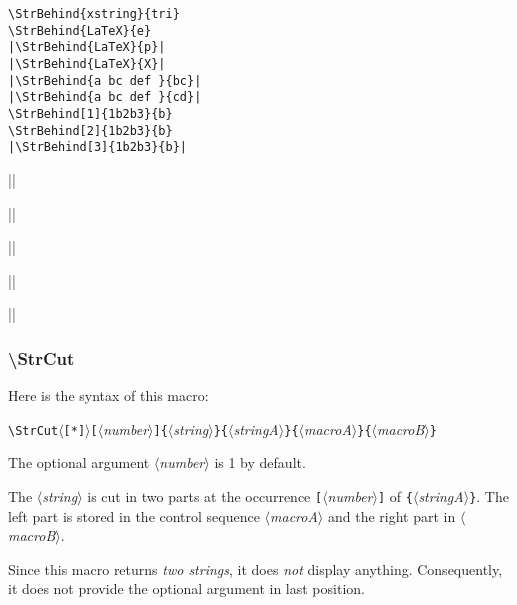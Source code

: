 \documentclass[a4paper,10pt]{article}
\newcommand\argu[1]{$\langle$\textit{#1}$\rangle$}
\newcommand\ARGU[1]{\texttt{\{}\argu{#1}\texttt{\}}}
\newcommand\arguC[1]{\texttt{[}\argu{#1}\texttt{]}}
\newcommand\etoile{$\langle$\texttt{[*]}$\rangle$}
\newcommand\styleexemple{\small\vskip4pt}
\newcommand\verbinline{\lstinline[basicstyle=\normalsize\ttfamily]}
\begin{document}
\begin{minipage}[t]{0.65\linewidth}
\begin{lstlisting}
\StrBehind{xstring}{tri}
\StrBehind{LaTeX}{e}
|\StrBehind{LaTeX}{p}|
|\StrBehind{LaTeX}{X}|
|\StrBehind{a bc def }{bc}|
|\StrBehind{a bc def }{cd}|
\StrBehind[1]{1b2b3}{b}
\StrBehind[2]{1b2b3}{b}
|\StrBehind[3]{1b2b3}{b}|
\end{lstlisting}%
\end{minipage}\hfill
\begin{minipage}[t]{0.35\linewidth}
	\styleexemple
	\par
	\par
	||\par
	||\par
	||\par
	||\par
	\par
	\par
	||
\end{minipage}%

\subsubsection{\ttfamily\textbackslash StrCut}
Here is the syntax of this macro:\par\nobreak\smallskip
\verbinline|\StrCut|\etoile\arguC{number}\ARGU{string}\ARGU{stringA}\ARGU{macroA}\ARGU{macroB}
\smallskip

The optional argument \argu{number} is 1 by default.\par\nobreak\smallskip
The \argu{string} is cut in two parts at the occurrence \arguC{number} of \ARGU{stringA}. The left part is stored in the control sequence \argu{macroA} and the right part in \argu{macroB}.

Since this macro returns \emph{two strings}, it does \emph{not} display anything. Consequently, it does not provide the optional argument in last position.\medskip
\end{document}

